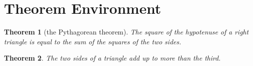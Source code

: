 \documentclass{article}
\newtheorem{thm}{Theorem}[section]      %
\begin{document}
    \section{Theorem Environment}
        \begin{thm}[the Pythagorean theorem]
            The square of the hypotenuse of a right triangle is equal to 
            the sum of the squares of the two sides. 
        \end{thm}
        \begin{thm}
            The two sides of a triangle add up to more than the third. 
        \end{thm}
\end{document}
